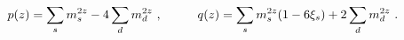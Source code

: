 \begin{equation}\label{1.3}
p(z)=\sum_s m_s^{2z}-4\sum_d m_d^{2z}~,\hskip 1cm
q(z)=\sum_s m_s^{2z}(1-6\xi_s)+2\sum_d m_d^{2z}~.
\end{equation}

